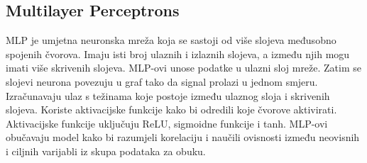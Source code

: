 \documentclass[]{foi}
\begin{document}
\subsection{Multilayer Perceptrons}
MLP je umjetna neuronska mreža koja se sastoji od više slojeva međusobno spojenih čvorova. Imaju isti broj ulaznih i izlaznih slojeva, a između njih mogu imati više skrivenih slojeva. 
MLP-ovi unose podatke u ulazni sloj mreže. Zatim se slojevi neurona povezuju u graf tako da signal prolazi u jednom smjeru. Izračunavaju ulaz s težinama koje postoje između ulaznog sloja i skrivenih slojeva. Koriste aktivacijske funkcije kako bi odredili koje čvorove aktivirati. Aktivacijske funkcije uključuju ReLU, sigmoidne funkcije i tanh. MLP-ovi obučavaju model kako bi razumjeli korelaciju i naučili ovisnosti između neovisnih i ciljnih varijabli iz skupa podataka za obuku. \cite{Simplilearn}


\makebackmatter
\end{document}
